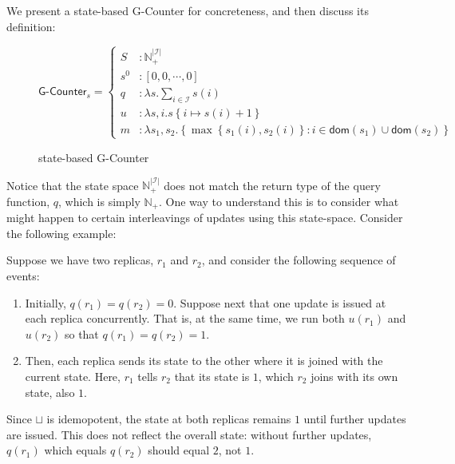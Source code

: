 We present a state-based G-Counter \CRDT for concreteness, and then discuss its
definition:

\begin{figure}[H]
  \centering
  \[
    \textsf{G-Counter}_s = \left\{\begin{aligned}
      S &: \mathbb{N}_+^{|\mathcal{I}|} \\
      s^0 &: \left[ 0, 0, \cdots, 0 \right] \\
      q &: \lambda s. \sum_{i \in \mathcal{I}} s(i) \\
      u &: \lambda s,i. s\left\{ i \mapsto s(i) + 1 \right\} \\
      m &: \lambda s_1, s_2. \left\{ \max\left\{ s_1(i), s_2(i) \right\}: i \in \mathsf{dom}(s_1) \cup
      \mathsf{dom}(s_2) \right\}
    \end{aligned}\right.
  \]
  \caption{state-based \textsf{G-Counter} \CRDT}
  \label{fig:state-gcounter}
\end{figure}

Notice that the state space $\mathbb{N}^{|\mathcal{I}|}_+$ does not match the
return type of the query function, $q$, which is simply $\mathbb{N}_+$. One way
to understand this is to consider what might happen to certain interleavings of
updates using this state-space. Consider the following example:

\begin{example}
  \label{example:vector-state-counter}
  Suppose we have two replicas, $r_1$ and $r_2$, and consider the following
  sequence of events:

  \begin{enumerate}
    \item Initially, $q(r_1) = q(r_2) = 0$. Suppose next that one update is
      issued at each replica concurrently. That is, at the same time, we run
      both $u(r_1)$ and $u(r_2)$ so that $q(r_1) = q(r_2) = 1$.
    \item Then, each replica sends its state to the other where it is joined
      with the current state. Here, $r_1$ tells $r_2$ that its state is $1$,
      which $r_2$ joins with its own state, also $1$.
  \end{enumerate}

  Since $\sqcup$ is idemopotent, the state at both replicas remains $1$ until
  further updates are issued. This does not reflect the overall state: without
  further updates, $q(r_1)$ which equals $q(r_2)$ should equal $2$, not $1$.
\end{example}

